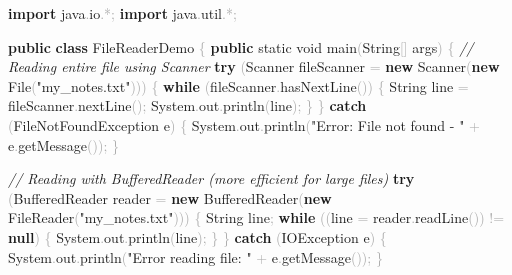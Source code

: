 \documentclass[
  justified,
  openright,
]{tufte-book}
\newcommand{\KeywordTok}[1]{\textcolor{CodeKeyword}{\textbf{#1}}}  %
\newcommand{\StringTok}[1]{\textcolor{CodeString}{#1}}              %
\newcommand{\CommentTok}[1]{\textcolor{CodeComment}{\textit{#1}}}  %
\newcommand{\CodeFuncTok}[1]{\textcolor{CodeKeyword}{#1}}           %
\newcommand{\CodeTypeTok}[1]{\textcolor{CodeType}{#1}}              %
\newcommand{\CodeAccentTok}[1]{\textcolor{CodeAccent}{#1}}          %
\newcommand{\OperatorTok}[1]{\textcolor{DarkGray}{#1}}              %
\newenvironment{Shaded}{%
  \begin{mdframed}[style=TufteCode]%
}{%
  \end{mdframed}%
}
\begin{document}
\begin{Shaded}
\begin{Highlighting}[]
\KeywordTok{import} \CodeAccentTok{java}\OperatorTok{.}\CodeAccentTok{io}\OperatorTok{.*;}
\KeywordTok{import} \CodeAccentTok{java}\OperatorTok{.}\CodeAccentTok{util}\OperatorTok{.*;}
 
\KeywordTok{public} \KeywordTok{class} FileReaderDemo \OperatorTok{\{}
    \KeywordTok{public} \CodeTypeTok{static} \CodeTypeTok{void} \CodeFuncTok{main}\OperatorTok{(}String\OperatorTok{[]} args\OperatorTok{)} \OperatorTok{\{}
        \CommentTok{// Reading entire file using Scanner}
        \KeywordTok{try} \OperatorTok{(}Scanner fileScanner \OperatorTok{=} \KeywordTok{new} Scanner\OperatorTok{(}\KeywordTok{new} File\OperatorTok{(}\StringTok{"my\_notes.txt"}\OperatorTok{)))} \OperatorTok{\{}
            \KeywordTok{while} \OperatorTok{(}fileScanner\OperatorTok{.}\CodeFuncTok{hasNextLine}\OperatorTok{())} \OperatorTok{\{}
                String line \OperatorTok{=} fileScanner\OperatorTok{.}\CodeFuncTok{nextLine}\OperatorTok{();}
                System\OperatorTok{.}\CodeFuncTok{out}\OperatorTok{.}\CodeFuncTok{println}\OperatorTok{(}line\OperatorTok{);}
            \OperatorTok{\}}
        \OperatorTok{\}} \KeywordTok{catch} \OperatorTok{(}FileNotFoundException e\OperatorTok{)} \OperatorTok{\{}
            System\OperatorTok{.}\CodeFuncTok{out}\OperatorTok{.}\CodeFuncTok{println}\OperatorTok{(}\StringTok{"Error: File not found {-} "} \OperatorTok{+} e\OperatorTok{.}\CodeFuncTok{getMessage}\OperatorTok{());}
        \OperatorTok{\}}
 
        \CommentTok{// Reading with BufferedReader (more efficient for large files)}
        \KeywordTok{try} \OperatorTok{(}BufferedReader reader \OperatorTok{=} \KeywordTok{new} BufferedReader\OperatorTok{(}\KeywordTok{new} FileReader\OperatorTok{(}\StringTok{"my\_notes.txt"}\OperatorTok{)))} \OperatorTok{\{}
            String line\OperatorTok{;}
            \KeywordTok{while} \OperatorTok{((}line \OperatorTok{=} reader\OperatorTok{.}\CodeFuncTok{readLine}\OperatorTok{())} \OperatorTok{!=} \KeywordTok{null}\OperatorTok{)} \OperatorTok{\{}
                System\OperatorTok{.}\CodeFuncTok{out}\OperatorTok{.}\CodeFuncTok{println}\OperatorTok{(}line\OperatorTok{);}
            \OperatorTok{\}}
        \OperatorTok{\}} \KeywordTok{catch} \OperatorTok{(}IOException e\OperatorTok{)} \OperatorTok{\{}
            System\OperatorTok{.}\CodeFuncTok{out}\OperatorTok{.}\CodeFuncTok{println}\OperatorTok{(}\StringTok{"Error reading file: "} \OperatorTok{+} e\OperatorTok{.}\CodeFuncTok{getMessage}\OperatorTok{());}
        \OperatorTok{\}}
 

\end{Highlighting}
\end{Shaded}
\end{document}
